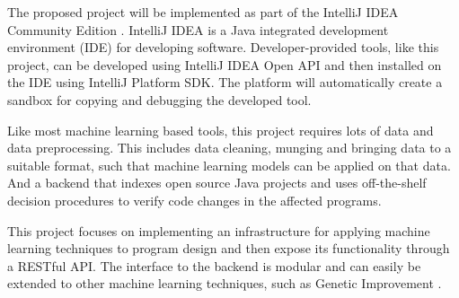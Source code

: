 The proposed project will be implemented as part of the IntelliJ IDEA Community
Edition \cite{jet2017intellij}. IntelliJ IDEA is a Java integrated
development environment (IDE) for developing software. Developer-provided tools,
like this project, can be developed using IntelliJ IDEA Open API and then
installed on the IDE using IntelliJ Platform SDK. The platform will
automatically create a sandbox for copying and debugging the developed tool.

Like most machine learning based tools, this project requires lots of data and
data preprocessing. This includes data cleaning, munging and bringing data
to a suitable format, such that machine learning models can be applied on
that data. And a backend that indexes open source Java projects and uses
off-the-shelf decision procedures to verify code changes in the affected
programs.

This project focuses on implementing an infrastructure for applying machine
learning techniques to program design and then expose its functionality
through a RESTful API. The interface to the backend is modular and can easily
be extended to other machine learning techniques, such as Genetic Improvement
\cite{white2011evolutionary}.

